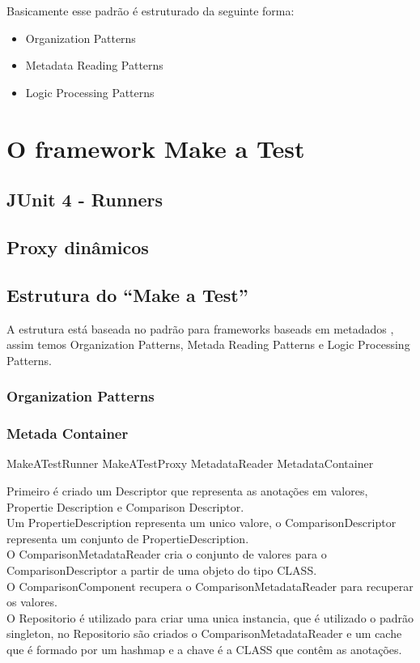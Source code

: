\documentclass{abnt}
\begin{document}
Basicamente esse padrão é estruturado da seguinte forma:\\

\begin{itemize}
	\item Organization Patterns
	\item Metadata Reading Patterns
	\item Logic Processing Patterns
\end{itemize}

\chapter{O framework Make a Test}
\section{JUnit 4 - Runners}
\section{Proxy dinâmicos}
\section{Estrutura do ``Make a Test''}
A estrutura está baseada no padrão para frameworks baseads em metadados \cite{GUERRA-PATTERN}, assim temos Organization Patterns, Metada Reading Patterns e Logic Processing Patterns.
\subsection{Organization Patterns}

\subsection{Metada Container}
MakeATestRunner
MakeATestProxy
MetadataReader
MetadataContainer


Primeiro é criado um Descriptor que representa as anotações em valores, Propertie Description e Comparison Descriptor.\\
Um PropertieDescription representa um unico valore, o ComparisonDescriptor representa um conjunto de PropertieDescription.\\

O ComparisonMetadataReader cria o conjunto de valores para o ComparisonDescriptor a partir de uma objeto do tipo CLASS.\\

O ComparisonComponent recupera o ComparisonMetadataReader para recuperar os valores.\\

O Repositorio é utilizado para criar uma unica instancia, que é utilizado o padrão singleton, no Repositorio são criados o ComparisonMetadataReader e um cache que é formado por um hashmap e a chave é a CLASS que contêm as anotações.



\end{document}
